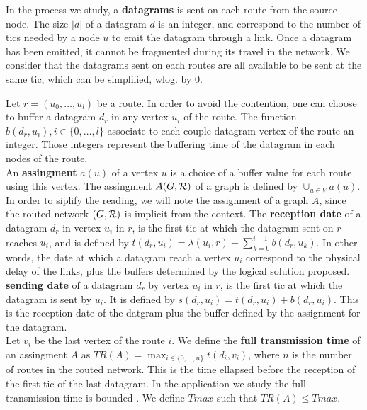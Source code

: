 \documentclass[english]{article}
\begin{document}
        In the process we study, a {\bf datagrams} is sent on each route from the source node. The size $|d|$ of a datagram $d$ is an integer, and correspond to the number of tics needed by a node $u$ to emit the datagram through a link. Once a datagram has been emitted, it cannot be fragmented during its travel in the network. We consider that the datagrams sent on each routes are all available to be sent at the same tic, which can be simplified, wlog. by $0$.
      
        
          Let $r=(u_0,\dots,u_l)$ be a route. In order to avoid the contention, one can choose to buffer a datagram $d_r$ in any vertex $u_i$ of the route. The function $b(d_r,u_i), i \in \{0,\ldots,l\}$ associate to each couple datagram-vertex of the route an integer. Those integers represent the buffering time of the datagram in each nodes of the route.\\
       

 An \textbf{assingment} $a(u)$ of a vertex $u$ is a choice of a buffer value for each route using this vertex. The assingment $A(G,\cal{R})$ of a graph is defined by $\cup_{u \in V} a(u)$. In order to siplify the reading, we will note the assignment of a graph $A$, since the routed network $(G,\cal{R})$ is implicit from the context. The \textbf{reception date} of a datagram $d_r$ in vertex $u_i$ in $r$, is the first tic at which the datagram sent on $r$ reaches $u_i$, and is defined by $t(d_r,u_i) = \lambda(u_i,r) + \sum_{k=0}^{i-1} b(d_r,u_k) $. In other words, the date at which a datagram reach a vertex $u_i$ correspond to the physical delay of the links, plus the buffers determined by the logical solution proposed.\\
 \textbf{sending date} of a datagram $d_r$ by vertex $u_i$ in $r$, is the first tic at which the datagram is sent by $u_i$. It is defined by $s(d_r,u_i) = t(d_r,u_i) +  b(d_r,u_i) $. This is the reception date of the datgram plus the buffer defined by the assignment for the datagram.\\
 
  Let $v_i$ be the last vertex of the route $i$.
       We define the \textbf{full transmission time} of an assingment $A$ as $TR(A) = \displaystyle \max_{i \in \{0,\ldots,n\}} t(d_i,v_i) $, where $n$ is the number of routes in the routed network. This is the time ellapsed before the reception of the first tic of the last datagram.
         In the application we study the full transmission time is bounded . We define $Tmax$ such that $TR(A) \leq Tmax$.
         
\end{document}
